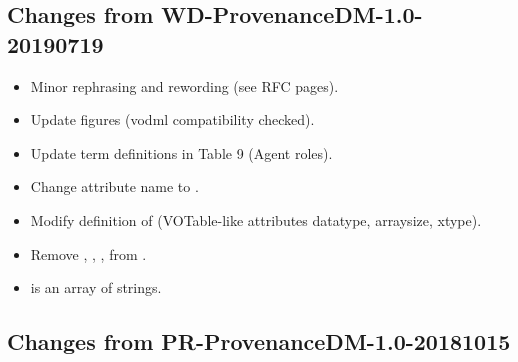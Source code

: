 
\subsection{Changes from WD-ProvenanceDM-1.0-20190719}

\begin{itemize}
\item Minor rephrasing and rewording (see RFC pages).
\item Update figures (vodml compatibility checked).
\item Update term definitions in Table 9 (Agent roles).
\item Change  attribute name to .
\item Modify definition of  (VOTable-like attributes datatype, arraysize, xtype).
\item Remove , , ,  from .
\item {} is an array of strings.
\end{itemize}


\subsection{Changes from PR-ProvenanceDM-1.0-20181015}

